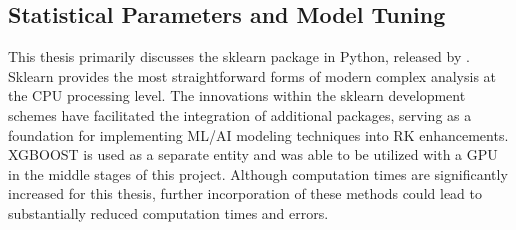 \subsection{Statistical Parameters and Model Tuning} \label{methods:tuning} This thesis primarily discusses the sklearn package in Python, released by \cite{buitinck_api_2013}. Sklearn provides the most straightforward forms of modern complex analysis at the CPU processing level. The innovations within the sklearn development schemes have facilitated the integration of additional packages, serving as a foundation for implementing ML/AI modeling techniques into RK enhancements. XGBOOST is used as a separate entity and was able to be utilized with a GPU in the middle stages of this project. Although computation times are significantly increased for this thesis, further incorporation of these methods could lead to substantially reduced computation times and errors.

